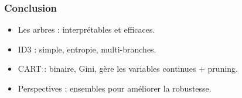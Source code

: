 \documentclass{beamer}
\begin{document}
\begin{frame}
	\frametitle{Conclusion}
	\begin{itemize}
		\item Les arbres : interprétables et efficaces.
		\item ID3 : simple, entropie, multi-branches.
		\item CART : binaire, Gini, gère les variables continues + pruning.
		\item Perspectives : ensembles pour améliorer la robustesse.
	\end{itemize}
\end{frame}
\end{document}
